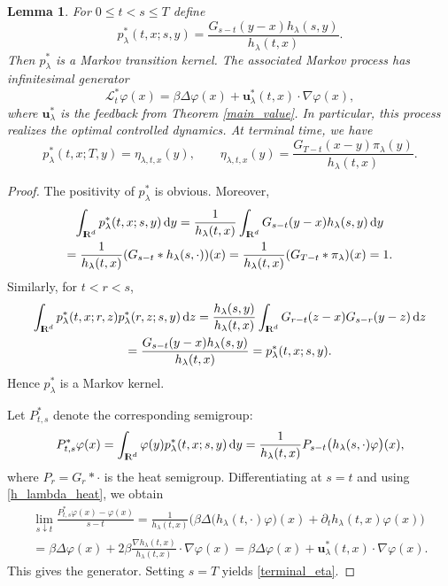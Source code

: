 \documentclass[11pt]{amsart}
\def\R{\mathrm{I\kern-0.21emR}}
\newcommand{\dd}{\,\mathrm{d}}
\renewcommand{\leq}{\leqslant}
\numberwithin{equation}{section}
\numberwithin{figure}{section}
\newtheorem{lemma}[theorem]{Lemma}%
\theoremstyle{definition}\newtheorem{remark}[theorem]{Remark}%
\begin{document}
\begin{lemma}\label{kernel_lemma}
For $0 \leq t < s \leq T$ define
$$
p_\lambda^*(t,x;s,y) = \frac{G_{s-t}(y-x) h_\lambda(s,y)}{h_\lambda(t,x)}.
$$
Then $p_\lambda^*$ is a Markov transition kernel. The associated Markov process has infinitesimal generator
$$
\mathcal L_t^* \varphi(x) = \beta \Delta \varphi(x) + \mathbf u_\lambda^*(t,x) \cdot \nabla \varphi(x),
$$
where $\mathbf u_\lambda^*$ is the feedback from Theorem \ref{main_value}. In particular, this process realizes the optimal controlled dynamics.
At terminal time, we have
\begin{equation}\label{terminal_eta}
p_\lambda^*(t,x;T,y) = \eta_{\lambda,t,x}(y),
\qquad
\eta_{\lambda,t,x}(y) = \frac{G_{T-t}(x-y)\pi_\lambda(y)}{h_\lambda(t,x)}.
\end{equation}
\end{lemma}

\begin{proof}
The positivity of $p_\lambda^*$ is obvious. Moreover,
\begin{multline*}
\int_{\R^d} p_\lambda^*(t,x;s,y)\dd y
= \frac{1}{h_\lambda(t,x)} \int_{\R^d} G_{s-t}(y-x)h_\lambda(s,y)\dd y \\
= \frac{1}{h_\lambda(t,x)} (G_{s-t} * h_\lambda(s,\cdot))(x)
= \frac{1}{h_\lambda(t,x)} (G_{T-t} * \pi_\lambda)(x)
= 1.
\end{multline*}
Similarly, for $t < r < s$,
\begin{multline*}
\int_{\R^d} p_\lambda^*(t,x;r,z)p_\lambda^*(r,z;s,y)\dd z
= \frac{h_\lambda(s,y)}{h_\lambda(t,x)} \int_{\R^d} G_{r-t}(z-x)G_{s-r}(y-z)\dd z \\
= \frac{G_{s-t}(y-x)h_\lambda(s,y)}{h_\lambda(t,x)}
= p_\lambda^*(t,x;s,y).
\end{multline*}
Hence $p_\lambda^*$ is a Markov kernel.

Let $P_{t,s}^*$ denote the corresponding semigroup:
$$
P_{t,s}^* \varphi(x) = \int_{\R^d} \varphi(y)p_\lambda^*(t,x;s,y)\dd y = \frac{1}{h_\lambda(t,x)} P_{s-t}\big( h_\lambda(s,\cdot)\varphi \big)(x),
$$
where $P_r = G_r * \cdot$ is the heat semigroup. Differentiating at $s = t$ and using \eqref{h_lambda_heat}, we obtain
\begin{multline*}
\lim_{s \downarrow t} \frac{P_{t,s}^* \varphi(x) - \varphi(x)}{s-t}
= \frac{1}{h_\lambda(t,x)} \Big( \beta \Delta \big( h_\lambda(t,\cdot)\varphi \big)(x) + \partial_t h_\lambda(t,x)\varphi(x) \Big) \\
= \beta \Delta \varphi(x) + 2\beta \frac{\nabla h_\lambda(t,x)}{h_\lambda(t,x)} \cdot \nabla \varphi(x)
= \beta \Delta \varphi(x) + \mathbf u_\lambda^*(t,x) \cdot \nabla \varphi(x).
\end{multline*}
This gives the generator. Setting $s = T$ yields \eqref{terminal_eta}.
\end{proof}
\end{document}
